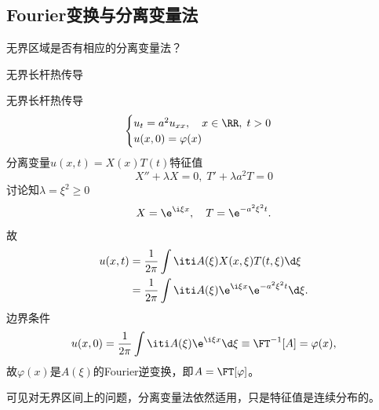 \subsection{Fourier变换与分离变量法}
无界区域是否有相应的分离变量法？
\begin{example}{无界长杆热传导}{}
	
	无界长杆热传导
	\begin{align*}
		\begin{cases}
			u_t=a^2u_{xx},\quad x\in\RR,\;t>0\\
			u(x,0)=\varphi(x)
		\end{cases}
	\end{align*}
	分离变量$u(x,t)=X(x)T(t)$特征值
	\[
		X''+\lambda X=0,\;T'+\lambda a^2T=0
	\]
	讨论知$\lambda=\xi^2\geqslant 0$
	\[
		X=\e^{\i\xi x},\quad T=\e^{-a^2\xi^2t}.
	\]
	故
	\begin{align*}
		u(x,t)&=\frac1{2\pi}\int\iti A(\xi)X(x,\xi)T(t,\xi)\d\xi\\
		&=\frac1{2\pi}\int\iti A(\xi)\e^{\i\xi x}\e^{-a^2\xi^2t}\d\xi.
	\end{align*}
	边界条件
	\[
		u(x,0)=\frac1{2\pi}\int\iti A(\xi)\e^{\i\xi x}\d\xi\equiv\FT^{-1}[A]=\varphi(x),
	\]
	故$\varphi(x)$是$A(\xi)$的Fourier逆变换，即$A=\FT[\varphi]$。
\end{example}
可见对无界区间上的问题，分离变量法依然适用，只是特征值是连续分布的。
